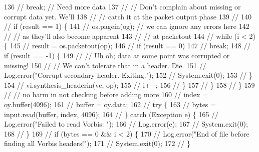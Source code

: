 \begin{DoxyCode}
136 \textcolor{comment}{//                      break; // Need more data}
137 \textcolor{comment}{//                  // Don't complain about missing or corrupt data yet.  We'll}
138 \textcolor{comment}{//                  // catch it at the packet output phase}
139 \textcolor{comment}{//}
140 \textcolor{comment}{//                  if (result == 1) \{}
141 \textcolor{comment}{//                      os.pagein(og); // we can ignore any errors here}
142 \textcolor{comment}{//                      // as they'll also become apparent}
143 \textcolor{comment}{//                      // at packetout}
144 \textcolor{comment}{//                      while (i < 2) \{}
145 \textcolor{comment}{//                          result = os.packetout(op);}
146 \textcolor{comment}{//                          if (result == 0)}
147 \textcolor{comment}{//                              break;}
148 \textcolor{comment}{//                          if (result == -1) \{}
149 \textcolor{comment}{//                              // Uh oh; data at some point was corrupted or missing!}
150 \textcolor{comment}{//                              // We can't tolerate that in a header.  Die.}
151 \textcolor{comment}{//                              Log.error("Corrupt secondary header.  Exiting.");}
152 \textcolor{comment}{//                              System.exit(0);}
153 \textcolor{comment}{//                          \}}
154 \textcolor{comment}{//                          vi.synthesis\_headerin(vc, op);}
155 \textcolor{comment}{//                          i++;}
156 \textcolor{comment}{//                      \}}
157 \textcolor{comment}{//                  \}}
158 \textcolor{comment}{//              \}}
159 \textcolor{comment}{//              // no harm in not checking before adding more}
160 \textcolor{comment}{//              index = oy.buffer(4096);}
161 \textcolor{comment}{//              buffer = oy.data;}
162 \textcolor{comment}{//              try \{}
163 \textcolor{comment}{//                  bytes = input.read(buffer, index, 4096);}
164 \textcolor{comment}{//              \} catch (Exception e) \{}
165 \textcolor{comment}{//                  Log.error("Failed to read Vorbis: ");}
166 \textcolor{comment}{//                  Log.error(e);}
167 \textcolor{comment}{//                  System.exit(0);}
168 \textcolor{comment}{//              \}}
169 \textcolor{comment}{//              if (bytes == 0 && i < 2) \{}
170 \textcolor{comment}{//                  Log.error("End of file before finding all Vorbis headers!");}
171 \textcolor{comment}{//                  System.exit(0);}
172 \textcolor{comment}{//              \}}

\end{DoxyCode}
